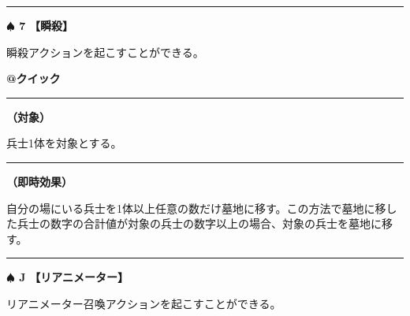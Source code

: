 \documentclass[twocolumn,a5paper,papersize,10pt]{jarticle}
\begin{document}
\vspace{-1zh}

 
 
 
 
 

\vspace{3mm} %
\hrule height 0.5mm depth 0mm width 66.5mm %
\vspace{1mm} %
{\Large\bf $\spadesuit$ 7} {\normalsize\bf【瞬殺】} %
\vspace{1mm} %

瞬殺アクションを起こすことができる。

\begin{tcolorbox}[title={\small\bf【Action】瞬殺}{\scriptsize （速攻魔法）}]

{\scriptsize\bf @クイック }

\vspace{1mm} %
\hrule height 0.1mm depth 0mm width 62mm %
\vspace{1mm} %

{\bf（対象）}

兵士1体を対象とする。

\vspace{1mm} %
\hrule height 0.1mm depth 0mm width 62mm %
\vspace{1mm} %

{\bf（即時効果）}

自分の場にいる兵士を1体以上任意の数だけ墓地に移す。この方法で墓地に移した兵士の数字の合計値が対象の兵士の数字以上の場合、対象の兵士を墓地に移す。

\vspace{1mm} %
\end{tcolorbox}

\vspace{-1zh}

 
 
 
 
 

\vspace{3mm} %
\hrule height 0.5mm depth 0mm width 66.5mm %
\vspace{1mm} %
{\Large\bf $\spadesuit$ J} {\normalsize\bf【リアニメーター】} %
\vspace{1mm} %

リアニメーター召喚アクションを起こすことができる。
\end{document}
